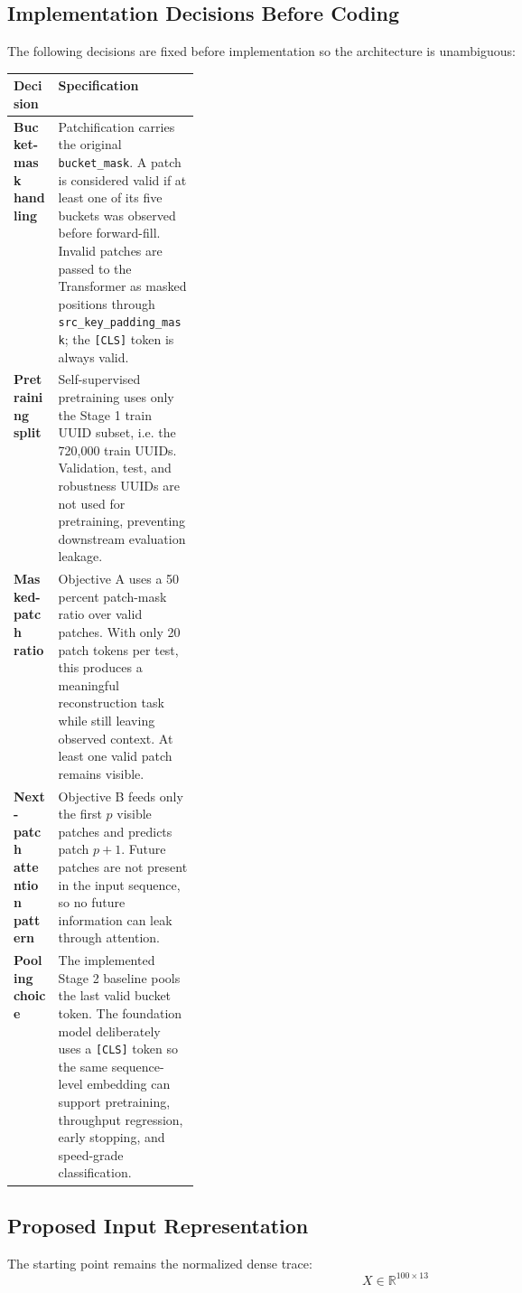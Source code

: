 \documentclass[11pt]{article}
\newcommand{\toprule}{\hline}
\newcommand{\midrule}{\hline}
\newcommand{\bottomrule}{\hline}
\begin{document}
\subsection{Implementation Decisions Before Coding}

The following decisions are fixed before implementation so the architecture is unambiguous:

\begin{center}
\begin{tabularx}{\linewidth}{>{\bfseries}p{0.24\linewidth} Y}
\toprule
Decision & Specification \\
\midrule
Bucket-mask handling & Patchification carries the original \texttt{bucket\_mask}. A patch is considered valid if at least one of its five buckets was observed before forward-fill. Invalid patches are passed to the Transformer as masked positions through \texttt{src\_key\_padding\_mask}; the \texttt{[CLS]} token is always valid. \\
Pretraining split & Self-supervised pretraining uses only the Stage 1 train UUID subset, i.e. the 720,000 train UUIDs. Validation, test, and robustness UUIDs are not used for pretraining, preventing downstream evaluation leakage. \\
Masked-patch ratio & Objective A uses a 50 percent patch-mask ratio over valid patches. With only 20 patch tokens per test, this produces a meaningful reconstruction task while still leaving observed context. At least one valid patch remains visible. \\
Next-patch attention pattern & Objective B feeds only the first \(p\) visible patches and predicts patch \(p+1\). Future patches are not present in the input sequence, so no future information can leak through attention. \\
Pooling choice & The implemented Stage 2 baseline pools the last valid bucket token. The foundation model deliberately uses a \texttt{[CLS]} token so the same sequence-level embedding can support pretraining, throughput regression, early stopping, and speed-grade classification. \\
\bottomrule
\end{tabularx}
\end{center}

\subsection{Proposed Input Representation}

The starting point remains the normalized dense trace:
\[
X \in \mathbb{R}^{100 \times 13}
\]
\end{document}
